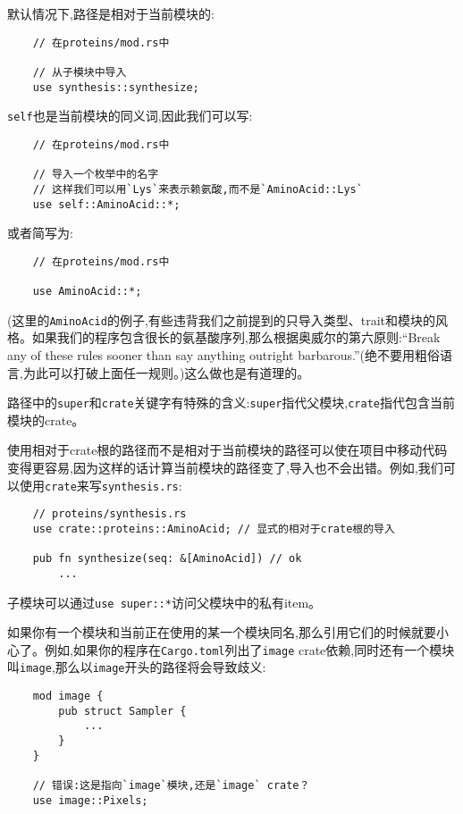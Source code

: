 默认情况下,路径是相对于当前模块的:
\begin{verbatim}
    // 在proteins/mod.rs中

    // 从子模块中导入
    use synthesis::synthesize;
\end{verbatim}

\texttt{self}也是当前模块的同义词,因此我们可以写:
\begin{verbatim}
    // 在proteins/mod.rs中

    // 导入一个枚举中的名字
    // 这样我们可以用`Lys`来表示赖氨酸,而不是`AminoAcid::Lys`
    use self::AminoAcid::*;
\end{verbatim}

或者简写为:
\begin{verbatim}
    // 在proteins/mod.rs中

    use AminoAcid::*;
\end{verbatim}

(这里的\texttt{AminoAcid}的例子,有些违背我们之前提到的只导入类型、trait和模块的风格。如果我们的程序包含很长的氨基酸序列,那么根据奥威尔的第六原则:“Break any of these rules sooner than say anything outright barbarous.”(绝不要用粗俗语言,为此可以打破上面任一规则。)这么做也是有道理的。

路径中的\texttt{super}和\texttt{crate}关键字有特殊的含义:\texttt{super}指代父模块,\texttt{crate}指代包含当前模块的crate。

使用相对于crate根的路径而不是相对于当前模块的路径可以使在项目中移动代码变得更容易,因为这样的话计算当前模块的路径变了,导入也不会出错。例如,我们可以使用\texttt{crate}来写\texttt{synthesis.rs}:
\begin{verbatim}
    // proteins/synthesis.rs
    use crate::proteins::AminoAcid; // 显式的相对于crate根的导入

    pub fn synthesize(seq: &[AminoAcid]) // ok
        ...
\end{verbatim}

子模块可以通过\texttt{use super::*}访问父模块中的私有item。

如果你有一个模块和当前正在使用的某一个模块同名,那么引用它们的时候就要小心了。例如,如果你的程序在\texttt{Cargo.toml}列出了\texttt{image} crate依赖,同时还有一个模块叫\texttt{image},那么以\texttt{image}开头的路径将会导致歧义:
\begin{verbatim}
    mod image {
        pub struct Sampler {
            ...
        }
    }

    // 错误:这是指向`image`模块,还是`image` crate？
    use image::Pixels;
\end{verbatim}


